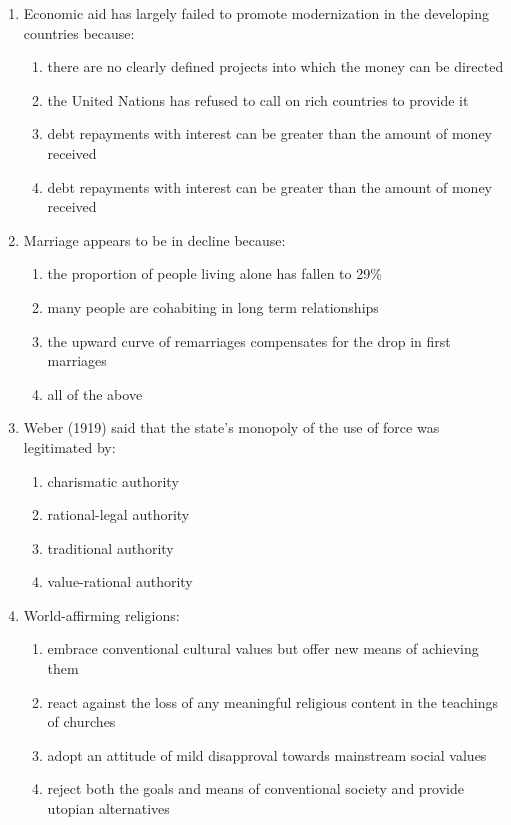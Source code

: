 \documentclass[12pt]{article}
\begin{document}
\begin{enumerate}[label=\arabic*.]
\item Economic aid has largely failed to promote modernization in the developing countries because:
\begin{enumerate}[label=(\alph*)]
    \item there are no clearly defined projects into which the money can be directed
    \item the United Nations has refused to call on rich countries to provide it
    \item debt repayments with interest can be greater than the amount of money received
    \item debt repayments with interest can be greater than the amount of money received
\end{enumerate}
\item Marriage appears to be in decline because:
\begin{enumerate}[label=(\alph*)]
    \item the proportion of people living alone has fallen to 29\%
    \item many people are cohabiting in long term relationships
    \item the upward curve of remarriages compensates for the drop in first marriages
    \item all of the above
\end{enumerate}
\item Weber (1919) said that the state's monopoly of the use of force was legitimated by:
\begin{enumerate}[label=(\alph*)]
    \item charismatic authority
    \item rational-legal authority
    \item traditional authority
    \item value-rational authority
\end{enumerate}
\item World-affirming religions:
\begin{enumerate}[label=(\alph*)]
    \item embrace conventional cultural values but offer new means of achieving them
    \item react against the loss of any meaningful religious content in the teachings of churches
    \item adopt an attitude of mild disapproval towards mainstream social values
    \item reject both the goals and means of conventional society and provide utopian alternatives

\end{enumerate}
\end{enumerate}
\end{document}
